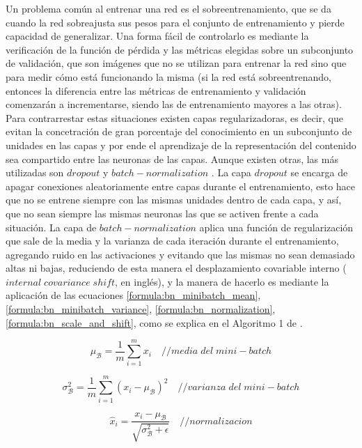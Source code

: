  Un problema común al entrenar una red es el sobreentrenamiento, que se da cuando la red sobreajusta sus pesos para el conjunto de entrenamiento y pierde capacidad de generalizar. Una forma fácil de controlarlo es mediante la verificación de la función de pérdida y las métricas elegidas sobre un subconjunto de validación, que son imágenes que no se utilizan para entrenar la red sino que para medir cómo está funcionando la misma (si la red está sobreentrenando, entonces la diferencia entre las métricas de entrenamiento y validación comenzarán a incrementarse, siendo las de entrenamiento mayores a las otras). Para contrarrestar estas situaciones existen capas regularizadoras, es decir, que evitan la concetración de gran porcentaje del conocimiento en un subconjunto de unidades en las capas y por ende el aprendizaje de la representación del contenido sea compartido entre las neuronas de las capas. Aunque existen otras, las más utilizadas son \(dropout\) \cite{baldi2013understanding} y \(batch-normalization\) \cite{BatchNorm}. La capa \(dropout\) se encarga de apagar conexiones aleatoriamente entre capas durante el entrenamiento, esto hace que no se entrene siempre con las mismas unidades dentro de cada capa, y así, que no sean siempre las mismas neuronas las que se activen frente a cada situación. La capa de \(batch-normalization\) aplica una función de regularización que sale de la media y la varianza de cada iteración durante el entrenamiento, agregando ruido en las activaciones y evitando que las mismas no sean demasiado altas ni bajas, reduciendo de esta manera el desplazamiento covariable interno (\(internal\;covariance\; shift\), en inglés), y la manera de hacerlo es mediante la aplicación de las ecuaciones \ref{formula:bn_minibatch_mean}, \ref{formula:bn_minibatch_variance}, \ref{formula:bn_normalization}, \ref{formula:bn_scale_and_shift}, como se explica en el Algoritmo 1 de \cite{BatchNorm}.
 
 
 \begin{equation}\label{formula:bn_minibatch_mean}
 \mu_{\mathcal{B}} = \frac{1}{m} \sum_{i=1}^{m} x_{i}
\quad { // media\; del \; mini-batch}
 \end{equation}
 
 \begin{equation}\label{formula:bn_minibatch_variance}
 \sigma_{\mathcal{B}}^{2} = \frac{1}{m} \sum_{i=1}^{m}\left(x_{i}-\mu_{\mathcal{B}}\right)^{2}
\quad { // varianza \; del \; mini-batch}
 \end{equation}
 
 \begin{equation}\label{formula:bn_normalization}
 \widehat{x}_{i} = \frac{x_{i}-\mu_{\mathcal{B}}}{\sqrt{\sigma_{\mathcal{B}}^{2}+\epsilon}}
\quad { // normalizacion}
 \end{equation}
 
